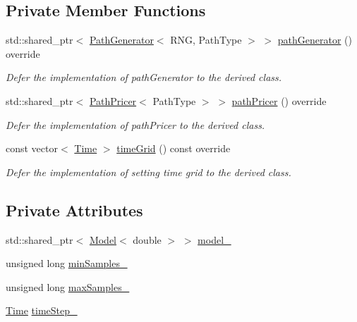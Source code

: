 \subsection*{Private Member Functions}
\begin{DoxyCompactItemize}
\item 
std\+::shared\+\_\+ptr$<$ \hyperlink{class_path_generator}{Path\+Generator}$<$ R\+NG, Path\+Type $>$ $>$ \hyperlink{class_mc_european_engine_a1e4fff8cadebec5aae259fc747dc12a3}{path\+Generator} () override
\begin{DoxyCompactList}\small\item\em Defer the implementation of path\+Generator to the derived class. \end{DoxyCompactList}\item 
std\+::shared\+\_\+ptr$<$ \hyperlink{class_path_pricer}{Path\+Pricer}$<$ Path\+Type $>$ $>$ \hyperlink{class_mc_european_engine_ab07c50b4305c3e65f68ce3f0c9b740d6}{path\+Pricer} () override
\begin{DoxyCompactList}\small\item\em Defer the implementation of path\+Pricer to the derived class. \end{DoxyCompactList}\item 
const vector$<$ \hyperlink{_name_def_8h_ac2d3e0ba793497bcca555c7c2cf64ff3}{Time} $>$ \hyperlink{class_mc_european_engine_ae4e0ab6834416144221f1a91dd154587}{time\+Grid} () const override
\begin{DoxyCompactList}\small\item\em Defer the implementation of setting time grid to the derived class. \end{DoxyCompactList}\end{DoxyCompactItemize}
\subsection*{Private Attributes}
\begin{DoxyCompactItemize}
\item 
std\+::shared\+\_\+ptr$<$ \hyperlink{class_model}{Model}$<$ double $>$ $>$ \hyperlink{class_mc_european_engine_a1065e84b2bf625de4ea8d9ed02eb15bf}{model\+\_\+}
\item 
unsigned long \hyperlink{class_mc_european_engine_a3e90a1e87e9096d2cbeebc45b0bb358b}{min\+Samples\+\_\+}
\item 
unsigned long \hyperlink{class_mc_european_engine_a25c0f328428ef5d24fef469e8861cca7}{max\+Samples\+\_\+}
\item 
\hyperlink{_name_def_8h_ac2d3e0ba793497bcca555c7c2cf64ff3}{Time} \hyperlink{class_mc_european_engine_abb61c5565c1f4a1775f04d4d28bd5d21}{time\+Step\+\_\+}
\end{DoxyCompactItemize}
